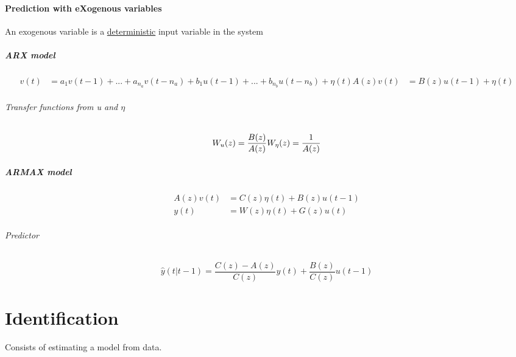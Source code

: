 \documentclass{article}
\begin{document}
\subsection{Prediction with eXogenous variables}
An exogenous variable is a \underline{deterministic} input variable in the system
\subsubsection{ARX model}
\begin{align*}
v(t)&=a_1v(t-1)+...+a_{n_a}v(t-n_a)+b_1u(t-1)+...+b_{n_b}u(t-n_b)+\eta(t)
A(z)v(t)&=B(z)u(t-1)+\eta(t)
\end{align*}
\paragraph{Transfer functions from u and $\eta$}
\[
W_u(z)=\frac{B(z)}{A(z)}\\
W_{\eta}(z)=\frac{1}{A(z)}
\]
\subsubsection{ARMAX model}
\begin{align*}
A(z)v(t)&=C(z)\eta(t)+B(z)u(t-1)\\
y(t)&=W(z)\eta(t)+G(z)u(t)
\end{align*}
\paragraph{Predictor}
\[
\hat{y}(t|t-1)=
\frac{C(z)-A(z)}{C(z)}y(t)
+\frac{B(z)}{C(z)}u(t-1)
\]

\newpage
\part{Identification}
Consists of estimating a model from data.
\end{document}
